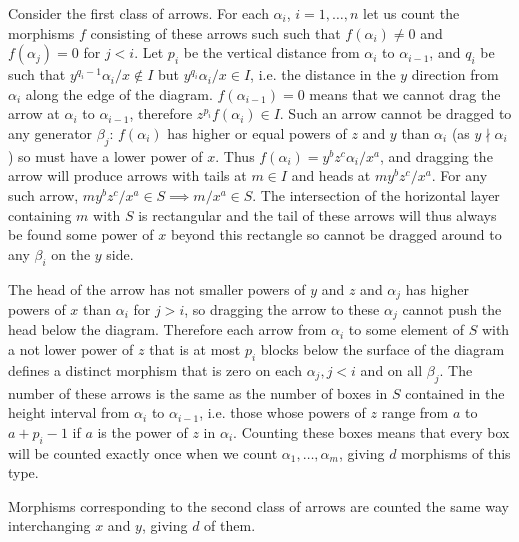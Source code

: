 \documentclass[a4paper,12pt,titlepage]{article}
\begin{document}
Consider the first class of arrows.
For each $\alpha_i$, $i=1, \dots, n$ let us count the morphisms $f$ consisting of these arrows such such that $f(\alpha_i) \neq 0$ and $f(\alpha_j)=0$ for $j<i$.
Let $p_i$ be the vertical distance from $\alpha_i$ to $\alpha_{i-1}$, and $q_i$ be such that $y^{q_i-1}\alpha_i/x \notin I$ but $y^{q_i}\alpha_i/x \in I$,
i.e. the distance in the $y$ direction from $\alpha_i$ along the edge of the diagram. $f(\alpha_{i-1})=0$ means that we cannot drag the arrow at $\alpha_i$ to $\alpha_{i-1}$,
therefore $z^{p_i}f(\alpha_i) \in I$. Such an arrow cannot be dragged to any generator $\beta_j$: 
$f(\alpha_i)$ has higher or equal powers of $z$ and $y$ than $\alpha_i$ (as $y \nmid \alpha_i$) so must have a lower power of $x$. Thus $f(\alpha_i)=y^bz^c\alpha_i/x^a$,
and dragging the arrow will produce arrows with tails at $m \in I$ and heads at $my^bz^c/x^a$. For any such arrow, $my^bz^c/x^a \in S \implies m/x^a \in S$.
The intersection of the horizontal layer containing $m$ with $S$ is rectangular and the tail of these arrows will thus always be found some power of $x$ beyond this rectangle
so cannot be dragged around to any $\beta_i$ on the $y$ side.

The head of the arrow has not smaller powers of $y$ and $z$ and $\alpha_j$ has higher powers of $x$ than $\alpha_i$ for $j>i$,
so dragging the arrow to these $\alpha_j$ cannot push the head below the diagram.
Therefore each arrow from $\alpha_i$ to some element of $S$ with a not lower power of $z$ that is at most $p_i$ blocks below the surface of the diagram
defines a distinct morphism that is zero on each $\alpha_j, j<i$ and on all $\beta_j$.
The number of these arrows is the same as the number of boxes in $S$ contained in the height interval from $\alpha_i$ to $\alpha_{i-1}$,
i.e. those whose powers of $z$ range from $a$ to $a+p_i-1$ if $a$ is the power of $z$ in $\alpha_i$.
Counting these boxes means that every box will be counted exactly once when we count $\alpha_1, \dots, \alpha_m$, giving $d$ morphisms of this type.

Morphisms corresponding to the second class of arrows are counted the same way interchanging $x$ and $y$, giving $d$ of them.
\end{document}

